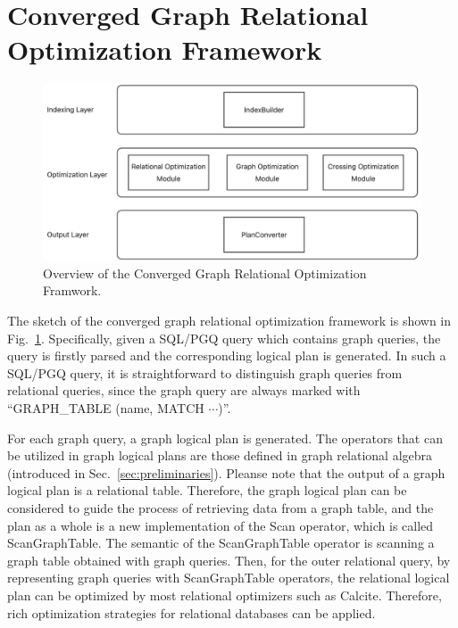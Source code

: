 \section{Converged Graph Relational Optimization Framework}

\begin{figure}
    \centering
    \includegraphics[width=\linewidth]{./figures/framework.png}
    \caption{Overview of the Converged Graph Relational Optimization Framwork.}
    \label{fig:framework-overview}
\end{figure}


The sketch of the converged graph relational optimization framework is shown in Fig.~\ref{fig:framework-overview}.
Specifically, given a SQL/PGQ query which contains graph queries, the query is firstly parsed and the corresponding logical plan is generated.
In such a SQL/PGQ query, it is straightforward to distinguish graph queries from relational queries, since the graph query are always marked with ``GRAPH\_TABLE (name, MATCH $\cdots$)''.

For each graph query, a graph logical plan is generated.
The operators that can be utilized in graph logical plans are those defined in graph relational algebra (introduced in Sec.~\ref{sec:preliminaries}).
Pleanse note that the output of a graph logical plan is a relational table.
Therefore, the graph logical plan can be considered to guide the process of retrieving data from a graph table, and the plan as a whole is a new implementation of the Scan operator, which is called ScanGraphTable.
The semantic of the ScanGraphTable operator is scanning a graph table obtained with graph queries.
Then, for the outer relational query, by representing graph queries with ScanGraphTable operators, the relational logical plan can be optimized by most relational optimizers such as Calcite.
Therefore, rich optimization strategies for relational databases can be applied.

